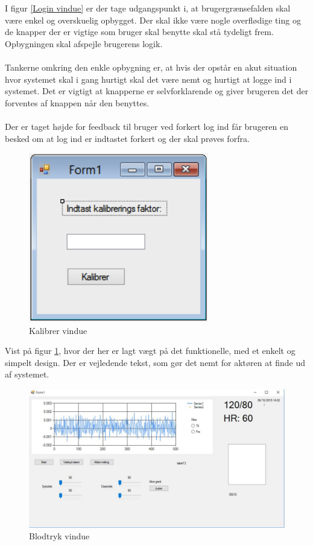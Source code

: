 I figur \ref{Login vindue} er der tage udgangspunkt i, at brugergrænsefalden skal være enkel og overskuelig opbygget. Der skal ikke være nogle overflødige ting og de knapper der er vigtige som bruger skal benytte skal stå tydeligt frem. Opbygningen skal afspejle brugerens logik.\\ \\ 
Tankerne omkring den enkle opbygning er, at hvis der opstår en akut situation hvor systemet skal i gang hurtigt skal det være nemt og hurtigt at logge ind i systemet. Det er vigtigt at knapperne er selvforklarende og giver brugeren det der forventes af knappen når den benyttes. \\ \\
Der er taget højde for feedback til bruger ved forkert log ind får brugeren en besked om at log ind er indtastet forkert og der skal prøves forfra. \\


\begin{figure}[H]
	\centering
	\includegraphics[width=0.7\textwidth]{Figurer/GUI/kalibrerGUI}
	\caption{Kalibrer vindue}
	\label{Kaliber vindue}
\end{figure}

Vist på figur \ref{Kaliber vindue}, hvor der her er lagt vægt på det funktionelle, med et enkelt og simpelt design. Der er vejledende tekst, som gør det nemt for aktøren at finde ud af systemet.

\begin{figure}[H]
	\centering
	\includegraphics[width=1\textwidth]{Figurer/GUI/GUI_form1}
	\caption{Blodtryk vindue}
	\label{Blodtryk vindue}
\end{figure}

